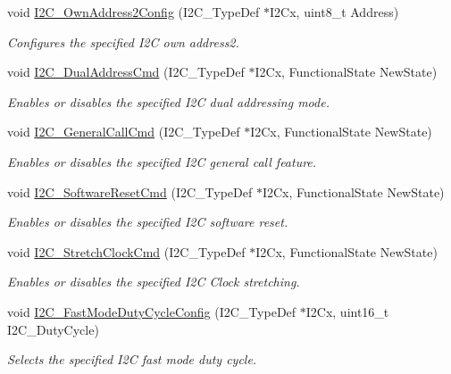 \begin{DoxyCompactItemize}
void \mbox{\hyperlink{group___i2_c___group1_ga7be2cc634a613c8e3539137e897a22df}{I2\+C\+\_\+\+Own\+Address2\+Config}} (I2\+C\+\_\+\+Type\+Def $\ast$I2\+Cx, uint8\+\_\+t Address)
\begin{DoxyCompactList}\small\item\em Configures the specified I2C own address2. \end{DoxyCompactList}\item 
void \mbox{\hyperlink{group___i2_c___group1_ga02145a333a56e79557d6ef4ea03fc313}{I2\+C\+\_\+\+Dual\+Address\+Cmd}} (I2\+C\+\_\+\+Type\+Def $\ast$I2\+Cx, Functional\+State New\+State)
\begin{DoxyCompactList}\small\item\em Enables or disables the specified I2C dual addressing mode. \end{DoxyCompactList}\item 
void \mbox{\hyperlink{group___i2_c___group1_ga65c740fc8d7b3b9f15cc432d8699d471}{I2\+C\+\_\+\+General\+Call\+Cmd}} (I2\+C\+\_\+\+Type\+Def $\ast$I2\+Cx, Functional\+State New\+State)
\begin{DoxyCompactList}\small\item\em Enables or disables the specified I2C general call feature. \end{DoxyCompactList}\item 
void \mbox{\hyperlink{group___i2_c___group1_ga1289c908aeb882443aba323b459c638b}{I2\+C\+\_\+\+Software\+Reset\+Cmd}} (I2\+C\+\_\+\+Type\+Def $\ast$I2\+Cx, Functional\+State New\+State)
\begin{DoxyCompactList}\small\item\em Enables or disables the specified I2C software reset. \end{DoxyCompactList}\item 
void \mbox{\hyperlink{group___i2_c___group1_ga7459feb3b1dfcd3e4f6574002ca7d3bd}{I2\+C\+\_\+\+Stretch\+Clock\+Cmd}} (I2\+C\+\_\+\+Type\+Def $\ast$I2\+Cx, Functional\+State New\+State)
\begin{DoxyCompactList}\small\item\em Enables or disables the specified I2C Clock stretching. \end{DoxyCompactList}\item 
void \mbox{\hyperlink{group___i2_c___group1_gaa570f76bc34e5b0531b29b1a90af1275}{I2\+C\+\_\+\+Fast\+Mode\+Duty\+Cycle\+Config}} (I2\+C\+\_\+\+Type\+Def $\ast$I2\+Cx, uint16\+\_\+t I2\+C\+\_\+\+Duty\+Cycle)
\begin{DoxyCompactList}\small\item\em Selects the specified I2C fast mode duty cycle. \end{DoxyCompactList}\item 

\end{DoxyCompactItemize}
